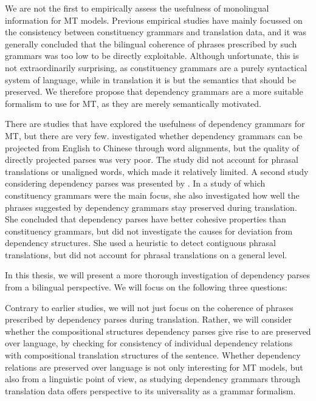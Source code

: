 \documentclass[hidelinks]{report}
\begin{document}
We are not the first to empirically assess the usefulness of monolingual information for MT models. Previous empirical studies have mainly focussed on the consistency between constituency grammars and translation data, and it was generally concluded that the bilingual coherence of phrases prescribed by such grammars was too low to be directly exploitable. Although unfortunate, this is not extraordinarily surprising, as constituency grammars are a purely syntactical system of language, while in translation it is but the semantics that should be preserved. We therefore propose that dependency grammars are a more suitable formalism to use for MT, as they are merely semantically motivated.

There are studies that have explored the usefulness of dependency grammars for MT, but there are very few. \cite{hwa2002evaluating} investigated whether dependency grammars can be projected from English to Chinese through word alignments, but the quality of directly projected parses was very poor. The study did not account for phrasal translations or unaligned words, which made it relatively limited. A second study considering dependency parses was presented by \cite{fox2002phrasal}. In a study of which constituency grammars were the main focus, she also investigated how well the phrases suggested by dependency grammars stay preserved during translation. She concluded that dependency parses have better cohesive properties than constituency grammars, but did not investigate the causes for deviation from dependency structures. She used a heuristic to detect contiguous phrasal translations, but did not account for phrasal translations on a general level.
 
In this thesis, we will present a more thorough investigation of dependency parses from a bilingual perspective. We will focus on the following three questions:

Contrary to earlier studies, we will not just focus on the coherence of phrases prescribed by dependency parses during translation. Rather, we will consider whether the compositional structures dependency parses give rise to are preserved over language, by checking for consistency of individual dependency relations with compositional translation structures of the sentence. Whether dependency relations are preserved over language is not only interesting for MT models, but also from a linguistic point of view, as studying dependency grammars through translation data offers perspective to its universality as a grammar formalism.\\
\end{document}
